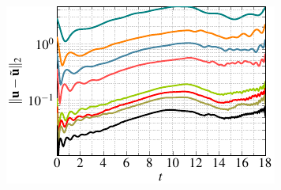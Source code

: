 \begin{figure}[t]
\centering
\begin{subfigure}[]{0.47\linewidth}
          \includegraphics[scale=1]{Figures/paper-figure2.pdf}

\end{subfigure}
\end{figure}
